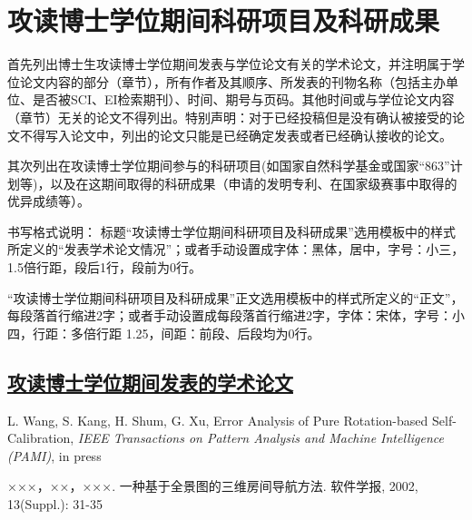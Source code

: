 ﻿%

%
%

\chapter*{\hfill 攻读博士学位期间科研项目及科研成果 \hfill}
首先列出博士生攻读博士学位期间发表与学位论文有关的学术论文，并注明属于学位论文内容的部分（章节），所有作者及其顺序、所发表的刊物名称（包括主办单位、是否被SCI、EI检索期刊）、时间、期号与页码。其他时间或与学位论文内容（章节）无关的论文不得列出。特别声明：对于已经投稿但是没有确认被接受的论文不得写入论文中，列出的论文只能是已经确定发表或者已经确认接收的论文。

其次列出在攻读博士学位期间参与的科研项目(如国家自然科学基金或国家“863”计划等)，以及在这期间取得的科研成果（申请的发明专利、在国家级赛事中取得的优异成绩等）。

书写格式说明：
标题“攻读博士学位期间科研项目及科研成果”选用模板中的样式所定义的“发表学术论文情况”；或者手动设置成字体：黑体，居中，字号：小三，1.5倍行距，段后1行，段前为0行。

“攻读博士学位期间科研项目及科研成果”正文选用模板中的样式所定义的“正文”，每段落首行缩进2字；或者手动设置成每段落首行缩进2字，字体：宋体，字号：小四，行距：多倍行距 1.25，间距：前段、后段均为0行。





\section*{\underline{攻读博士学位期间发表的学术论文}}
\begin{publist}
\item L. Wang, S. Kang, H. Shum, G. Xu, Error Analysis of Pure
  Rotation-based Self-Calibration, {\em{IEEE Transactions on Pattern
      Analysis and Machine Intelligence (PAMI)}}, in press
\item ×××，××，×××. 一种基于全景图的三维房间导航方法.
  软件学报, 2002, 13(Suppl.): 31-35
\end{publist}


